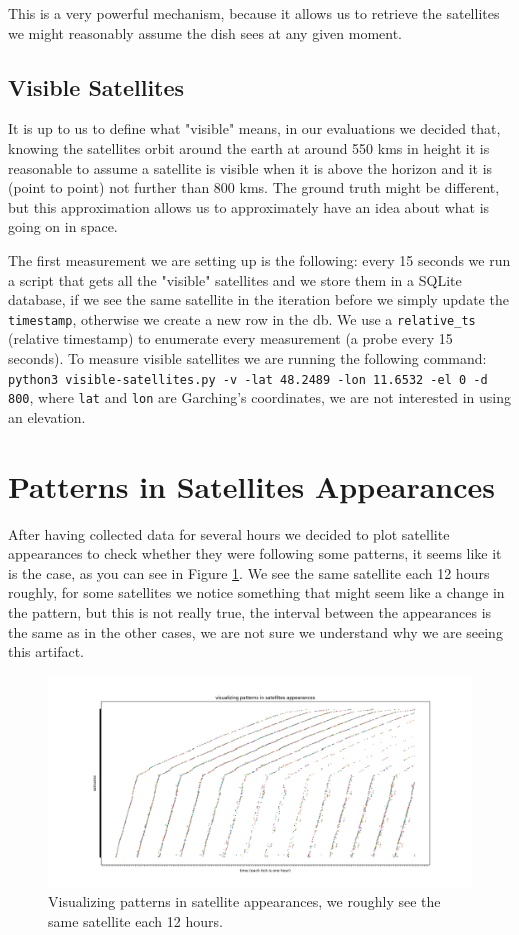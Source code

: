 \documentclass[IN,11pt,twoside,openright,bachelor,english]{tumthesis}
\begin{document}
This is a very powerful mechanism, because it allows us to retrieve the satellites we might reasonably assume the dish sees at any given moment.
\subsection{Visible Satellites}
It is up to us to define what "visible" means, in our evaluations we decided that, knowing the satellites orbit around the earth at around 550 kms in height it is reasonable to assume a satellite is visible when it is above the horizon and it is (point to point) not further than 800 kms. The ground truth might be different, but this approximation allows us to approximately have an idea about what is going on in space. 

The first measurement we are setting up is the following: every 15 seconds we run a script that gets all the "visible" satellites and we store them in a SQLite database, if we see the same satellite in the iteration before we simply update the \texttt{timestamp}, otherwise we create a new row in the db. We use a \texttt{relative\_ts} (relative timestamp) to enumerate every measurement (a probe every 15 seconds). To measure visible satellites we are running the following command: \texttt{python3 visible-satellites.py -v -lat 48.2489 -lon 11.6532 -el 0 -d 800}, where \texttt{lat} and \texttt{lon} are Garching's coordinates, we are not interested in using an elevation.


\section{Patterns in Satellites Appearances}
After having collected data for several hours we decided to plot satellite appearances to check whether they were following some patterns, it seems like it is the case, as you can see in Figure \ref{fig:vis-sat-pat}. We see the same satellite each 12 hours roughly, for some satellites we notice something that might seem like a change in the pattern, but this is not really true, the interval between the appearances is the same as in the other cases, we are not sure we understand why we are seeing this artifact.

\begin{figure}
	\centering
	\includegraphics[width=1.2\columnwidth]{img/visualizing-how-long-satellites-are-visible-for.png}
	\caption{Visualizing patterns in satellite appearances, we roughly see the same satellite each 12 hours.}
	\label{fig:vis-sat-pat}
\end{figure}
\end{document}
